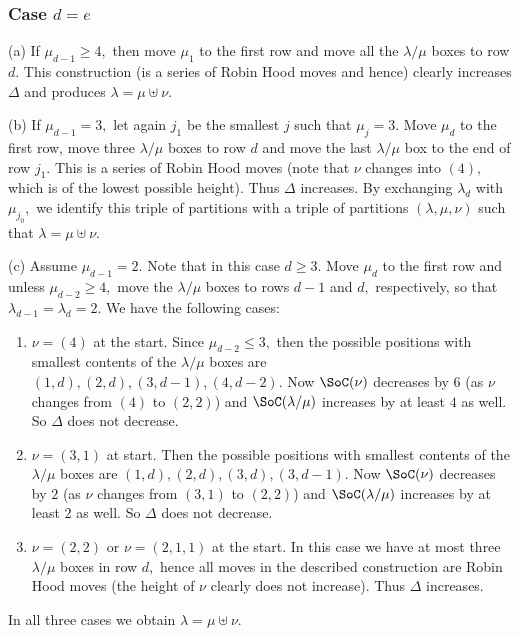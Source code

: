 \documentclass[12pt,dvipsnames,accepted=2016-08-18,a4paper,onecolumn]{quantumarticle}
\def\la{\lambda}
\def\la{\lambda}
\numberwithin{equation}{section}
\theoremstyle{definition}
\begin{document}
\subsubsection{Case $d=e$}

(a) If $\mu_{d-1}\geq 4,$ then move $\mu_1$ to the first row and move all the $\la/\mu$ boxes to row $d.$ This construction (is a series of Robin Hood moves and hence) clearly increases $\Delta$ and produces $\la = \mu \uplus \nu.$

(b) If $\mu_{d-1} = 3,$ let again $j_1$ be the smallest $j$ such that $\mu_j=3.$ Move $\mu_d$ to the first row, move three $\la/\mu$ boxes to row $d$ and move the last $\la/\mu$ box to the end of row $j_1.$ This is a series of Robin Hood moves (note that $\nu$ changes into $(4),$ which is of the lowest possible height). Thus $\Delta$ increases. By exchanging $\la_d$ with $\mu_{j_0},$ we identify this triple of partitions with a triple of partitions $(\la,\mu,\nu)$ such that $\la = \mu \uplus \nu.$

(c) Assume $\mu_{d-1} =  2.$ Note that in this case $d\geq 3.$ Move $\mu_d$ to the first row and  unless $\mu_{d-2}\geq 4,$ move the $\la/\mu$ boxes to rows $d-1$ and $d,$ respectively, so that $\la_{d-1}=\la_d=2.$ We have the following cases:

\begin{enumerate}
    \item $\nu=(4)$ at the start. Since $\mu_{d-2}\leq 3,$ then the possible positions with smallest contents of the  $\la/\mu$ boxes are $(1,d),(2,d),(3,d-1),(4,d-2).$ Now $\SoC(\nu)$ decreases by $6$ (as $\nu$ changes from $(4)$ to $(2,2)$) and  $\SoC(\la/\mu)$ increases by at least $4$ as well. So $\Delta$ does not decrease.
    \item $\nu=(3,1)$ at  start. Then the possible positions with smallest contents of the  $\la/\mu$ boxes are $(1,d),(2,d),(3,d),(3,d-1).$ Now $\SoC(\nu)$ decreases by $2$ (as $\nu$ changes from $(3,1)$ to $(2,2)$) and  $\SoC(\la/\mu)$ increases by at least $2$ as well. So $\Delta$ does not decrease.
    \item $\nu=(2,2)$ or $\nu=(2,1,1)$ at the start. In this case we have at most three $\la/\mu$ boxes in row $d,$ hence all moves in the described construction are Robin Hood moves (the height of $\nu$ clearly does not increase). Thus $\Delta$ increases.
\end{enumerate}
In all three cases we obtain $\la = \mu \uplus \nu.$
\vspace{3mm}
\end{document}
